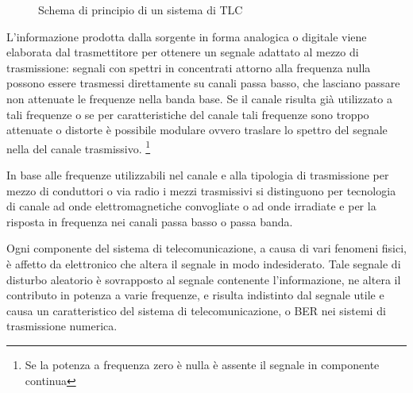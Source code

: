 \begin{figure}[!ht]
\centering
{}
\caption{Schema di principio di un sistema di TLC}\label{fig:schema_sistema_telecomunicazioni}
\end{figure}

L'informazione prodotta dalla sorgente in forma analogica o digitale viene elaborata dal trasmettitore per ottenere un segnale adattato al mezzo di trasmissione: segnali con spettri in  concentrati attorno alla frequenza nulla possono essere trasmessi direttamente su canali passa basso, che lasciano passare non attenuate le frequenze nella banda base. Se il canale risulta già utilizzato a tali frequenze o se per caratteristiche del canale tali frequenze sono troppo attenuate o distorte è possibile modulare ovvero traslare lo spettro del segnale nella  del canale trasmissivo. \footnote{Se la potenza a frequenza zero è nulla è assente il segnale in componente continua}

In base alle frequenze utilizzabili nel canale e alla tipologia di trasmissione per mezzo di conduttori o via radio i mezzi trasmissivi si distinguono per tecnologia di canale ad onde elettromagnetiche convogliate o ad onde irradiate e per la risposta in frequenza nei canali passa basso o passa banda.

Ogni componente del sistema di telecomunicazione, a causa di vari fenomeni fisici, è affetto da  elettronico che altera il segnale in modo indesiderato. Tale segnale di disturbo aleatorio è sovrapposto al segnale contenente l'informazione, ne altera il contributo in potenza a varie frequenze, e risulta indistinto dal segnale utile e causa un  caratteristico del sistema di telecomunicazione, o \ac{BER} nei sistemi di trasmissione numerica. 

